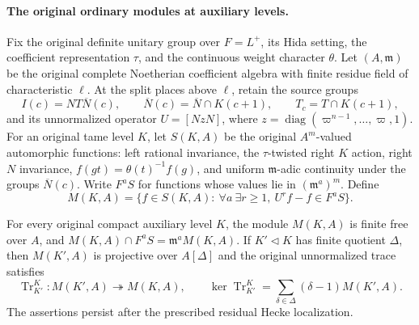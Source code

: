 \paragraph{The original ordinary modules at auxiliary levels.}
Fix the original definite unitary group over $F=L^+$, its Hida
setting, the coefficient representation $\tau$, and the continuous
weight character $\theta$. Let $(A,\mathfrak m)$ be the original
complete Noetherian coefficient algebra with finite residue field of
characteristic $\ell$. At the split places above $\ell$, retain the
source groups
\[
 I(c)=NT\overline N(c),\qquad
 \overline N(c)=\overline N\cap K(c+1),\qquad
 T_c=T\cap K(c+1),
\]
and its unnormalized operator
$U=[NzN]$, where
$z=\operatorname{diag}(\varpi^{n-1},\ldots,\varpi,1)$.
For an original tame level $K$, let $S(K,A)$ be the original
$A^m$-valued automorphic functions: left rational invariance, the
$\tau$-twisted right $K$ action, right $N$ invariance,
$f(gt)=\theta(t)^{-1}f(g)$, and uniform $\mathfrak m$-adic continuity
under the groups $\overline N(c)$. Write $F^aS$ for functions whose
values lie in $(\mathfrak m^a)^m$. Define
\[
 M(K,A)=\{f\in S(K,A):
       \ \forall a\ \exists r\geq1,\ U^rf-f\in F^aS\}.
 \tag{OD1}
\]

\begin{proposition}
\label{prop:selmer-ordinary-diamond}
For every original compact auxiliary level $K$, the module $M(K,A)$
is finite free over $A$, and
$M(K,A)\cap F^aS=\mathfrak m^aM(K,A)$.
If $K'\triangleleft K$ has finite quotient $\Delta$, then
$M(K',A)$ is projective over $A[\Delta]$ and the original
unnormalized trace satisfies
\[
 \operatorname{Tr}_{K'}^K:M(K',A)\twoheadrightarrow M(K,A),
 \qquad
 \ker\operatorname{Tr}_{K'}^K
   =\sum_{\delta\in\Delta}(\delta-1)M(K',A).
 \tag{OD2}
\]
The assertions persist after the prescribed residual Hecke
localization.
\end{proposition}

